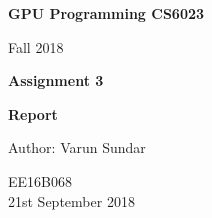 \begin{titlepage}
    \begin{center}
        \vspace*{1cm}
        
        \Huge
          \textbf{GPU Programming CS6023}
        
        \vspace{0.5cm}
        \LARGE
        Fall 2018
        
        \vspace{1.5cm}
        
        \textbf{Assignment 3}
   		  \vspace{1.5cm}
        
        \textbf{Report}
       
        \vfill
        
        Author: Varun Sundar
        
        \vspace{0.8cm}
          \Large
        EE16B068 \\
        \vspace{0.5cm}
       21st September 2018
        
    \end{center}
\end{titlepage}